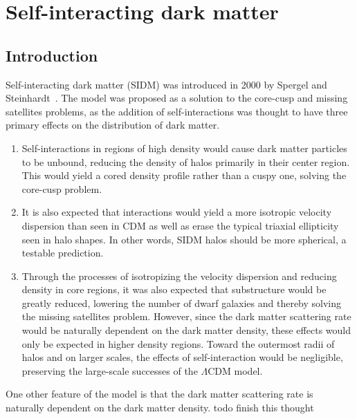 \hypertarget{self-interacting-dark-matter}{%
\chapter{Self-interacting dark
matter}\label{self-interacting-dark-matter}}

\hypertarget{introduction}{%
\section{Introduction}\label{introduction}}

Self-interacting dark matter (SIDM) was introduced in 2000 by Spergel
and Steinhardt~\cite{spergel_observational_2000}. The model was proposed as
a solution to the core-cusp and missing satellites problems, as the
addition of self-interactions was thought to have three primary effects
on the distribution of dark matter. 

\begin{enumerate}
    \item Self-interactions in regions of high density would cause dark matter
    particles to be unbound, reducing the density of halos primarily in their
    center region. This would yield a cored density profile rather than a
    cuspy one, solving the core-cusp problem.

    \item It is also expected that interactions would yield a more isotropic
    velocity dispersion than seen in CDM as well as erase the typical triaxial
    ellipticity seen in halo shapes. In other words, SIDM halos should be more
    spherical, a testable prediction.

    \item Through the processes of isotropizing the velocity dispersion and
    reducing density in core regions, it was also expected that substructure
    would be greatly reduced, lowering the number of dwarf galaxies and
    thereby solving the missing satellites problem. However, since the dark
    matter scattering rate would be naturally dependent on the dark matter
    density, these effects would only be expected in higher density regions.
    Toward the outermost radii of halos and on larger scales, the effects of
    self-interaction would be negligible, preserving the large-scale successes
    of the \(\Lambda\)CDM model.
\end{enumerate}

One other feature of the model is that the dark matter scattering rate is
naturally dependent on the dark matter density. todo finish this thought

